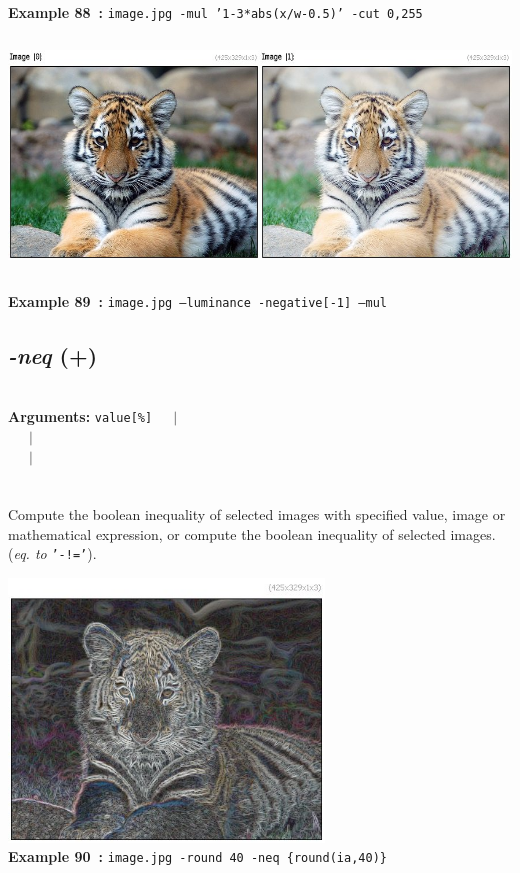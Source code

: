 \documentclass[a4paper,11pt,twoside]{book}
\begin{document}
\begin{center}
{\footnotesize \textbf{Example 88~:} \texttt{image.jpg -mul '1-3*abs(x/w-0.5)' -cut 0,255}}
\\\includegraphics[keepaspectratio=true,height=7cm,width=\textwidth]{img/gmic_def89.jpg}\\
{\footnotesize \textbf{Example 89~:} \texttt{image.jpg --luminance -negative[-1] --mul}}
\end{center}

\subsection{\emph{-neq} (+)}\vspace*{-0.5em}
~\\\textbf{Arguments: } 
{\small \texttt{value[\%]}}~~~$|$\\
\hspace*{2.2cm}{\small \texttt{[image]}}~~~$|$\\
~~~$|$\\
\\~\\
Compute the boolean inequality of selected images with specified value, image or
mathematical expression, or compute the boolean inequality of selected images.
~\\(\emph{eq. to} {\small \texttt{'-!='}}).
\begin{center}\includegraphics[keepaspectratio=true,height=7cm,width=\textwidth]{img/gmic_def90.jpg}\\
{\footnotesize \textbf{Example 90~:} \texttt{image.jpg -round 40 -neq \{round(ia,40)\}}}
\end{center}
\end{document}
